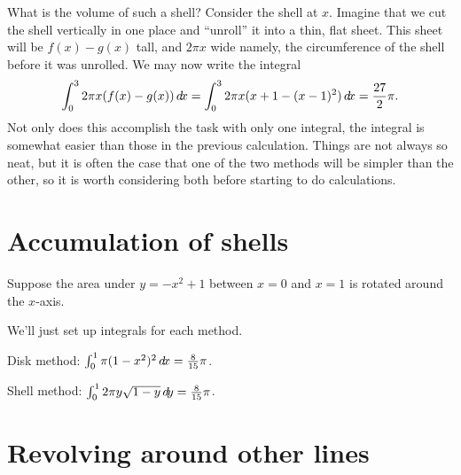 \documentclass{ximera}
\begin{document}







What is the volume of such a shell?  Consider the shell at
$x$.  Imagine that we cut the shell vertically in one place and
``unroll'' it into a thin, flat sheet. This sheet will be $f(x)-g(x)$
tall, and $2\pi x$ wide namely, the circumference of the shell before
it was unrolled.  We may now write the integral
$$
  \int_0^3 2\pi x(f(x)-g(x))\mathop{}\!d\! x=
  \int_0^3 2\pi x(x+1-(x-1)^2)\mathop{}\!d\! x={27\over2}\pi.
$$
Not only does this accomplish the task with only one integral, the
integral is somewhat easier than those in the previous
calculation. Things are not always so neat, but it is often the case
that one of the two methods will be simpler than the other, so it is
worth considering both before starting to do calculations.


\section{Accumulation of shells}


\begin{example} 
Suppose the area under $y=-x^2+1$ between $x=0$ and $x=1$ is rotated
around the $x$-axis.
\begin{explanation}
We'll just set up integrals for each method.

Disk method: $\int_0^1 \pi(1-x^2)^2\mathop{}\!d\! x={8\over15}\pi$.


Shell method: $\int_0^1 2\pi y \sqrt{1-y}\mathop{}\!d\! y={8\over15}\pi$.
\end{explanation}
\end{example}

\section{Revolving around other lines}
\end{document}
